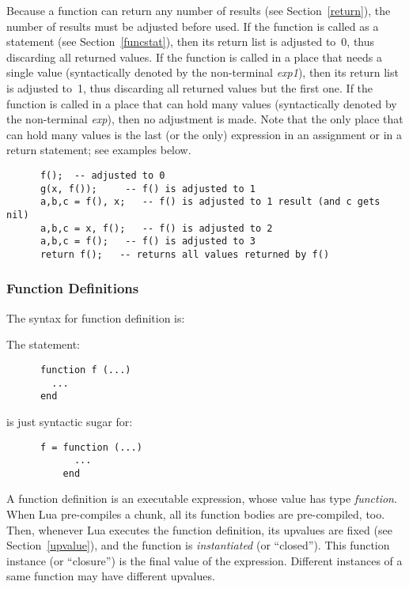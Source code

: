 \documentclass[11pt]{article}
\newcommand{\See}[1]{Section~\ref{#1}}
\newcommand{\see}[1]{(see \See{#1})}
\newcommand{\M}[1]{\emph{#1}}
\newcommand{\Index}[1]{#1\index{#1}}
\begin{document}
Because a function can return any number of results
\see{return},
the number of results must be adjusted before used.
If the function is called as a statement \see{funcstat},
then its return list is adjusted to~0,
thus discarding all returned values.
If the function is called in a place that needs a single value
(syntactically denoted by the non-terminal \M{exp1}),
then its return list is adjusted to~1,
thus discarding all returned values but the first one.
If the function is called in a place that can hold many values
(syntactically denoted by the non-terminal \M{exp}),
then no adjustment is made.
Note that the only place that can hold many values
is the last (or the only) expression in an assignment
or in a return statement; see examples below.
\begin{verbatim}
      f();  -- adjusted to 0
      g(x, f());     -- f() is adjusted to 1
      a,b,c = f(), x;   -- f() is adjusted to 1 result (and c gets nil)
      a,b,c = x, f();   -- f() is adjusted to 2
      a,b,c = f();   -- f() is adjusted to 3
      return f();   -- returns all values returned by f()
\end{verbatim}

\subsubsection{\Index{Function Definitions}} \label{func-def}

The syntax for function definition is:
\begin{Produc}
\end{Produc}
The statement:
\begin{verbatim}
      function f (...)
        ...
      end
\end{verbatim}
is just syntactic sugar for:
\begin{verbatim}
      f = function (...)
            ...
          end
\end{verbatim}

A function definition is an executable expression,
whose value has type \emph{function}.
When Lua pre-compiles a chunk,
all its function bodies are pre-compiled, too.
Then, whenever Lua executes the function definition,
its upvalues are fixed \see{upvalue},
and the function is \emph{instantiated} (or ``closed'').
This function instance (or ``closure'')
is the final value of the expression.
Different instances of a same function
may have different upvalues.
\end{document}
